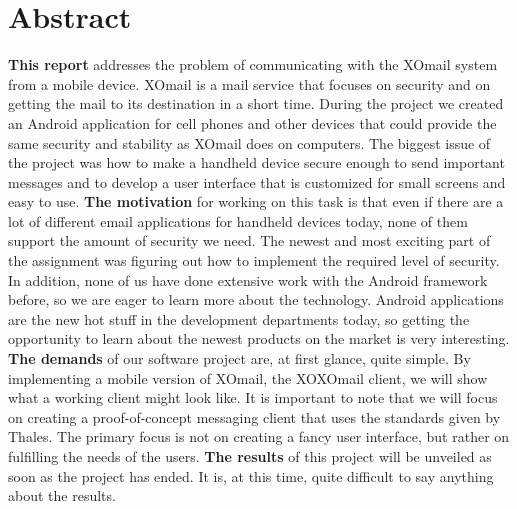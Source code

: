 
\chapter*{Abstract}

\textbf{This report} addresses the problem of communicating with the XOmail system from a mobile device. XOmail is a mail service that focuses on security and on getting the mail to its destination in a short time. During the project we created an Android application for cell phones and other devices that could provide the same security and stability as XOmail does on computers. The biggest issue of the project was how to make a handheld device secure enough to send important messages and to develop a user interface that is customized for small screens and easy to use. 
\newline
\newline
\textbf{The motivation} for working on this task is that even if there are a lot of different email applications for handheld devices today, none of them support the amount of security we need. The newest and most exciting part of the assignment was figuring out how to implement the required level of security. In addition, none of us have done extensive work with the Android framework before, so we are eager to learn more about the technology. Android applications are the new hot stuff in the development departments today, so getting the opportunity to learn about the newest products on the market is very interesting. 
\newline
\newline
\textbf{The demands} of our software project are, at first glance, quite simple. By implementing a mobile version of XOmail, the XOXOmail client, we will show what a working client might look like. It is important to note that we will focus on creating a proof-of-concept messaging client that uses the standards given by Thales. The primary focus is not on creating a fancy user interface, but rather on fulfilling the needs of the users. 
\newline
\newline
\textbf{The results} of this project will be unveiled as soon as the project has ended. It is, at this time, quite difficult to say anything about the results.

